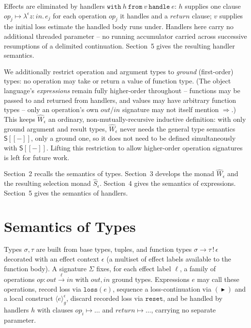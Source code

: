 \documentclass[11pt]{article}
\theoremstyle{plain}
\newcommand{\Ssem}[1]{\mathsf{S}[\![#1]\!]}
\newcommand{\Wm}[1]{\widehat{W}_{#1}}
\newcommand{\eps}{\epsilon}
\newcommand{\op}{\mathit{op}}
\newcommand{\then}{\mathrel{\blacktriangleright}}
\newcommand{\loc}[1]{\langle #1 \rangle} %
\begin{document}
Effects are eliminated by handlers $\mathtt{with}\ h\ \mathtt{from}\ v\ \mathtt{handle}\
e$: $h$ supplies one clause $\op_j\mapsto\lambda^\eps z\!:\!\mathit{in}.\,e_j$ for each
operation $\op_j$ it handles and a $\mathit{return}$ clause; $v$ supplies the initial loss
estimate the handled body runs under. Handlers here carry no additional threaded
parameter -- no running accumulator carried across successive resumptions of a delimited
continuation. Section~5 gives the resulting handler semantics.

We additionally restrict operation and argument types to \emph{ground} (first-order)
types: no operation may take or return a value of function type. (The object language's
\emph{expressions} remain fully higher-order throughout -- functions may be passed to and
returned from handlers, and values may have arbitrary function types -- only an
operation's own $\mathit{out}$/$\mathit{in}$ signature may not itself mention
$\Rightarrow$.) This keeps $\Wm\eps$ an ordinary, non-mutually-recursive inductive
definition: with only ground argument and result types, $\Wm\eps$ never needs the general
type semantics $\Ssem{-}$, only a ground one, so it does not need to be defined
simultaneously with $\Ssem{-}$. Lifting this restriction to allow higher-order operation
signatures is left for future work.

Section~2 recalls the semantics of types. Section~3 develops the monad $\Wm\eps$ and the
resulting selection monad $\widehat S_\eps$. Section~4 gives the semantics of expressions.
Section~5 gives the semantics of handlers.

\section{Semantics of Types}

Types $\sigma,\tau$ are built from base types, tuples, and function types
$\sigma\to\tau\,!\,\eps$ decorated with an effect context $\eps$ (a multiset of effect
labels available to the function body). A signature $\Sigma$ fixes, for each effect label
$\ell$, a family of operations $\op:\mathit{out}\xrightarrow{\ell}\mathit{in}$ with
$\mathit{out},\mathit{in}$ ground types. Expressions $e$ may call these operations, record
loss via $\mathtt{loss}(e)$, sequence a loss-continuation via $(\then)$ and a local
construct $\loc{e}_g^\eps$, discard recorded loss via $\mathtt{reset}$, and be handled by
handlers $h$ with clauses $\op_i\mapsto\dots$ and $\mathit{return}\mapsto\dots$, carrying
no separate parameter.
\end{document}
